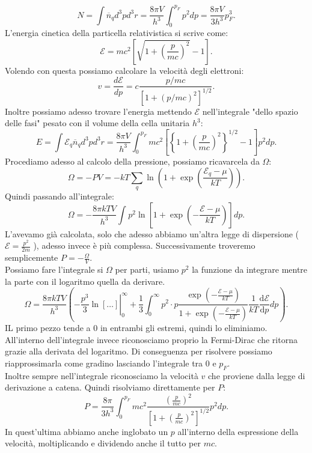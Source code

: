 \[
	N = \int \overline{n}_{q}d^3p d^3r= \frac{8\pi V}{h^3}\int_{0}^{p_{F}} p^2dp = \frac{8\pi V}{3h^3}p_{F}^3 
.\] 
L'energia cinetica della particella relativistica si scrive come:
\[
	\mathcal{E} = mc^2\left[ \sqrt{1 + \left( \frac{p}{mc} \right)^2} - 1 \right] 
.\] 
Volendo con questa possiamo calcolare la velocità degli elettroni:
\[
	v = \frac{d\mathcal{E} }{dp} = c \frac{p / mc }{\left[ 1 + \left( p /mc  \right)^2 \right] ^{1 /2}}
.\] 
Inoltre possiamo adesso trovare l'energia mettendo $\mathcal{E} $ nell'integrale "dello spazio delle fasi" pesato con il volume della cella unitaria $h^3$:
\[
	E = \int\mathcal{E} _{q} \overline{n}_{q}d^3p d^3r = \frac{8\pi V}{h^3}\int_{0}^{p_{F}} mc^2\left[ \left\{ 1 + \left( \frac{p}{mc} \right)^{2} \right\}^{1 /2} -1 \right] p^2dp 
.\] 
Procediamo adesso al calcolo della pressione, possiamo ricavarcela da $\Omega $:
\[
	\Omega = - PV = - kT \sum_{q}^{} \ln\left( 1+\exp\left( \frac{\mathcal{E} _{q}-\mu }{kT} \right)  \right) 
.\] 
Quindi passando all'integrale:
\[
	\Omega = - \frac{8\pi kTV}{h^3}\int_{}^{} p^2\ln\left[ 1 + \exp\left( - \frac{\mathcal{E} - \mu }{kT} \right)  \right] dp 
.\] 
L'avevamo già calcolata, solo che adesso abbiamo un'altra legge di dispersione ($\mathcal{E} = \frac{p^2}{2m}$ ), adesso invece è più complessa. Successivamente troveremo semplicemente $P = - \frac{\Omega }{V}$.\\
Possiamo fare l'integrale si $\Omega $ per parti, usiamo $p^2$ la funzione da integrare mentre la parte con il logaritmo quella da derivare.
\[
	\Omega = \frac{8\pi kTV}{h^3}\left( - \left.\frac{p^3}{3}\ln\left[ \ldots \right] \right|_{0}^{\infty} + \frac{1}{3}\int_{0}^{\infty} p^2\cdot p \frac{\exp\left( -\frac{\mathcal{E} -\mu }{kT} \right) }{1 + \exp\left( -\frac{\mathcal{E} -\mu }{kT} \right) } \frac{1}{kT} \frac{\mbox{d} \mathcal{E} }{\mbox{d} p}  dp
 \right) 
 .\] 
IL primo pezzo tende a $0$ in entrambi gli estremi, quindi lo eliminiamo. All'interno dell'integrale invece riconosciamo proprio la Fermi-Dirac che ritorna grazie alla derivata del logaritmo. Di conseguenza per risolvere possiamo riapprossimarla come gradino lasciando l'integrale tra $0$ e $p_{F}$. \\
Inoltre sempre nell'integrale riconosciamo la velocità $v$ che proviene dalla legge di derivazione a catena. Quindi risolviamo direttamente per $P$:
\[
	P = \frac{8\pi}{3h^3}\int_{0}^{p_{F}} mc^2 \frac{\left( \frac{p}{mc} \right) ^2}{\left[ 1+ \left( \frac{p}{mc} \right) ^2 \right] ^{1 /2}} p^2 dp
.\]
In quest'ultima abbiamo anche inglobato un $p$ all'interno della espressione della velocità, moltiplicando e dividendo anche il tutto per $mc$.\\
